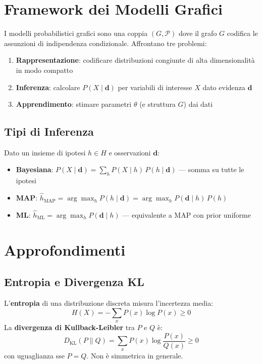 \section{Framework dei Modelli Grafici}

I modelli probabilistici grafici sono una coppia $(G, \mathcal{P})$ dove il grafo $G$ codifica le assunzioni di indipendenza condizionale. Affrontano tre problemi:

\begin{enumerate}
    \item \textbf{Rappresentazione}: codificare distribuzioni congiunte di alta dimensionalità in modo compatto
    \item \textbf{Inferenza}: calcolare $P(X \mid \mathbf{d})$ per variabili di interesse $X$ dato evidenza $\mathbf{d}$
    \item \textbf{Apprendimento}: stimare parametri $\theta$ (e struttura $G$) dai dati
\end{enumerate}

\subsection{Tipi di Inferenza}

Dato un insieme di ipotesi $h \in H$ e osservazioni $\mathbf{d}$:
\begin{itemize}
    \item \textbf{Bayesiana}: $P(X \mid \mathbf{d}) = \sum_h P(X \mid h)\,P(h \mid \mathbf{d})$ — somma su tutte le ipotesi
    \item \textbf{MAP}: $\hat{h}_{\text{MAP}} = \arg\max_h P(h \mid \mathbf{d}) = \arg\max_h P(\mathbf{d} \mid h)\,P(h)$
    \item \textbf{ML}: $\hat{h}_{\text{ML}} = \arg\max_h P(\mathbf{d} \mid h)$ — equivalente a MAP con prior uniforme
\end{itemize}

\section{Approfondimenti}

\subsection{Entropia e Divergenza KL}

\begin{tcolorbox}[title=Entropia e Informazione]
L'\textbf{entropia} di una distribuzione discreta misura l'incertezza media:
\[H(X) = -\sum_x P(x)\log P(x) \geq 0\]
La \textbf{divergenza di Kullback-Leibler} tra $P$ e $Q$ è:
\[D_\text{KL}(P \| Q) = \sum_x P(x)\log\frac{P(x)}{Q(x)} \geq 0\]
con uguaglianza sse $P = Q$. Non è simmetrica in generale.
\end{tcolorbox}

